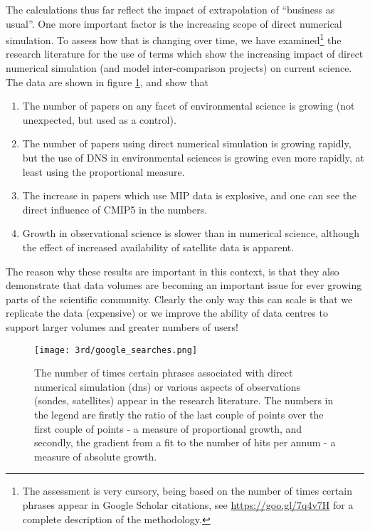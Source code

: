 The calculations thus far reflect the impact of extrapolation of ``business as usual''. One more important factor is the increasing scope of direct numerical simulation.  To assess how that is changing over time, we have examined\footnote{The assessment is very cursory, being based on the number of times certain phrases appear in Google Scholar citations, see \url{https://goo.gl/7q4v7H} for a complete description of the methodology.} the research literature for the use of terms which show the increasing impact of direct numerical simulation (and model inter-comparison projects) on current science. The data are shown in figure \ref{fig:citations}, and show that
\begin {enumerate}
\item  The number of papers on any facet of environmental science is growing (not unexpected, but used as a control).
\item The number of papers using direct numerical simulation is growing rapidly, but the use of DNS in environmental sciences is growing even more rapidly, at least using the proportional measure.
\item  The increase in papers which use MIP data is explosive, and one can see the direct influence of CMIP5 in the numbers.
\item Growth in observational science is slower than in numerical science, although the effect of increased availability of satellite data is apparent.
\end{enumerate}
The reason why these results are important in this context, is that they also demonstrate that data volumes are becoming an important issue for ever growing parts of the scientific community. Clearly the only way this can scale is that we replicate the data (expensive) or we improve the ability of data centres to support larger volumes and greater numbers of users!

\begin{figure}
\centering\texttt{[image: 3rd/google\_searches.png]}
\caption{The number of times certain phrases associated with direct numerical simulation (dns) or various aspects of observations (sondes, satellites) appear in the research literature. The numbers in the legend are firstly the ratio of the last couple of points over the first couple of points - a measure of proportional growth, and secondly, the gradient from a fit to the number of hits per annum - a measure of absolute growth.}
\label{fig:citations}
\end{figure}
